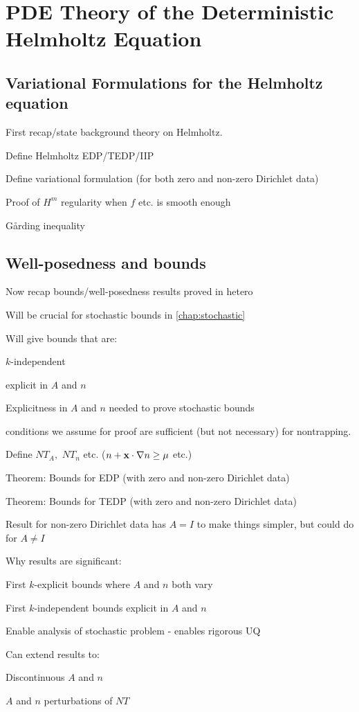\section{PDE Theory of the Deterministic Helmholtz Equation}
  
  \subsection{Variational Formulations for the Helmholtz equation}
First recap/state background theory on Helmholtz.
\bit
\item Define Helmholtz EDP/TEDP/IIP
\item Define variational formulation (for both zero and non-zero Dirichlet data)
\item Proof of $H^m$ regularity when $f$ etc. is smooth enough
\item G\r{a}rding inequality
  \eit

  \subsection{Well-posedness and bounds}
\bit
\item Now recap bounds/well-posedness results proved in hetero
\item Will be crucial for stochastic bounds in \cref{chap:stochastic}
\item Will give bounds that are:
\bit
\item $k$-independent
\item explicit in $A$ and $n$
\eit
\item Explicitness in $A$ and $n$ needed to prove stochastic bounds
\item conditions we assume for proof are sufficient (but not necessary) for nontrapping.
\eit

\bit
\item Define $NT_A,$ $NT_n$ etc. ($n + \mathbf{x} \cdot \nabla n \geq \mu$ etc.)
\item Theorem: Bounds for EDP (with zero and non-zero Dirichlet data)
\item Theorem: Bounds for TEDP (with zero and non-zero Dirichlet data)
\item Result for non-zero Dirichlet data has $A=I$ to make things simpler, but could do for $A \neq I$
\item Why results are significant:
\bit
\item First $k$-explicit bounds where $A$ and $n$ both vary
\item First $k$-independent bounds explicit in $A$ and $n$
\item Enable analysis of stochastic problem - enables rigorous UQ
\eit
\item Can extend results to:
\bit
\item Discontinuous $A$ and $n$
\item $A$ and $n$ perturbations of $NT$
\eit
\eit

